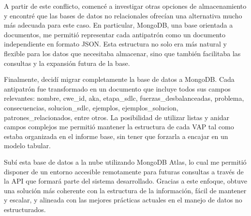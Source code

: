 A partir de este conflicto, comencé a investigar otras opciones de almacenamiento y encontré que las bases de datos no relacionales ofrecían una alternativa mucho más adecuada para este caso. En particular, MongoDB, una base orientada a documentos, me permitió representar cada antipatrón como un documento independiente en formato JSON. Esta estructura no solo era más natural y flexible para los datos que necesitaba almacenar, sino que también facilitaba las consultas y la expansión futura de la base.

Finalmente, decidí migrar completamente la base de datos a MongoDB. Cada antipatrón fue transformado en un documento que incluye todos sus campos relevantes: nombre, cwe\_id, aka, etapa\_sdlc, fuerzas\_desbalanceadas, problema, consecuencias, solucion\_sdlc, ejemplos, ejemplos\_solucion, patrones\_relacionados, entre otros. La posibilidad de utilizar listas y anidar campos complejos me permitió mantener la estructura de cada VAP tal como estaba organizada en el informe base, sin tener que forzarla a encajar en un modelo tabular.

Subí esta base de datos a la nube utilizando MongoDB Atlas, lo cual me permitió disponer de un entorno accesible remotamente para futuras consultas a través de la API que formará parte del sistema desarrollado. Gracias a este enfoque, obtuve una solución más coherente con la estructura de la información, fácil de mantener y escalar, y alineada con las mejores prácticas actuales en el manejo de datos no estructurados.


